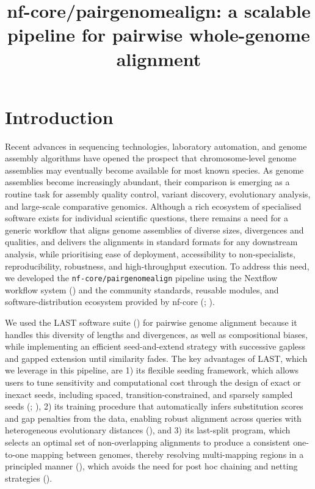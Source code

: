 \documentclass[PCJ,Unicode,screen]{cedram}
\title[Pairwise genome alignment pipeline]{nf-core/pairgenomealign: a scalable pipeline for pairwise whole-genome alignment}
\author{\firstname{Charles} \lastname{Plessy}\CDRorcid{0000-0001-7410-6295}}
\author{\firstname{Mohammed} \lastname{Mahdi}\CDRorcid{0009-0001-7484-0331}}
\author{\firstname{Takahiro} \lastname{Fujita}}
\author{\firstname{Martin} \middlename{C.} \lastname{Frith}\CDRorcid{0000-0003-0998-2859}}
\author{\firstname{Nicholas} \middlename{M.} \lastname{Luscombe}\CDRorcid{0000-0001-5293-4778}}
\begin{document}
\maketitle
\onehalfspacing

\section*{Introduction}

Recent advances in sequencing technologies, laboratory automation, and genome assembly algorithms have opened the prospect that chromosome-level genome assemblies may eventually become available for most known species. As genome assemblies become increasingly abundant, their comparison is emerging as a routine task for assembly quality control, variant discovery, evolutionary analysis, and large-scale comparative genomics. Although a rich ecosystem of specialised software exists for individual scientific questions, there remains a need for a generic workflow that aligns genome assemblies of diverse sizes, divergences and qualities, and delivers the alignments in standard formats for any downstream analysis, while prioritising ease of deployment, accessibility to non-specialists, reproducibility, robustness, and high-throughput execution. To address this need, we developed the \texttt{nf-core/pairgenomealign} pipeline using the Nextflow workflow system (\cite{Di_Tommaso_2017}) and the community standards, reusable modules, and software-distribution ecosystem provided by nf-core (\cite{Ewels_2020}; \cite{Langer_2025}).

We used the LAST software suite (\cite{Frith_2010}) for pairwise genome alignment because it handles this diversity of lengths and divergences, as well as compositional biases, while implementing an efficient seed-and-extend strategy with successive gapless and gapped extension until similarity fades. The key advantages of LAST, which we leverage in this pipeline, are 1) its flexible seeding framework, which allows users to tune sensitivity and computational cost through the design of exact or inexact seeds, including spaced, transition-constrained, and sparsely sampled seeds (\cite{Noé_2005}; \cite{Frith_2023}), 2) its training procedure that automatically infers substitution scores and gap penalties from the data, enabling robust alignment across queries with heterogeneous evolutionary distances (\cite{Hamada_2017}), and 3) its last-split program, which selects an optimal set of non-overlapping alignments to produce a consistent one-to-one mapping between genomes, thereby resolving multi-mapping regions in a principled manner (\cite{Frith_2015}), which avoids the need for post hoc chaining and netting strategies (\cite{Kent_2003}).
\end{document}
